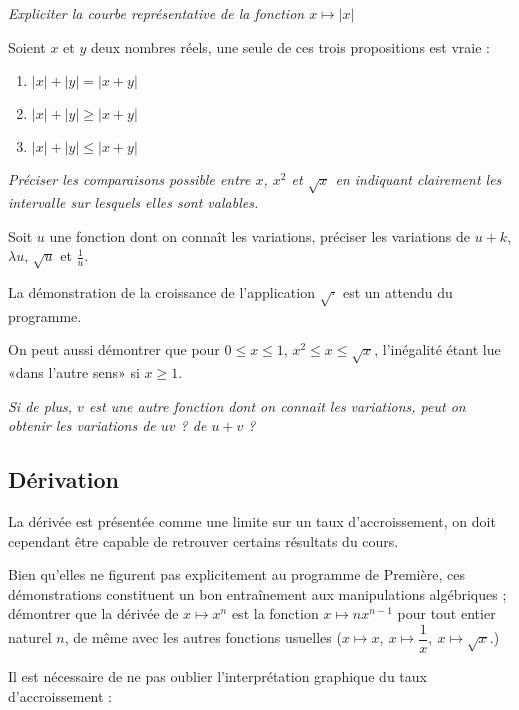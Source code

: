 \documentclass[a4paper,12pt,french]{article}
\newcommand{\abs}[1]{\left\lvert #1\right\rvert}
\begin{document}
    \emph{Expliciter la courbe représentative de la fonction $x\mapsto
    \abs{x}$}

Soient $x$ et $y$ deux nombres réels, une seule de ces trois
propositions est vraie :
\begin{multicols}{3}
  \begin{enumerate}
    \item $\abs{x} + \abs{y} = \abs{x+y}$
    \item $\abs{x} + \abs{y} \geqslant \abs{x+y}$
    \item $\abs{x} + \abs{y} \leqslant \abs{x+y}$
  \end{enumerate}
\end{multicols}

\emph{Préciser les comparaisons possible entre $x$, $x^2$ et $\sqrt{x}$
en indiquant clairement les intervalle sur lesquels elles sont
valables.}

Soit $u$ une fonction dont on connaît les variations, préciser les
variations de $u + k$, $\lambda u$, $\sqrt{u}$ et $\frac1u$.

La démonstration de la croissance de l'application $\sqrt{\cdot}$ est un
attendu du programme.

On peut aussi démontrer que pour $0\leqslant x \leqslant 1$, $x^2
\leqslant x \leqslant \sqrt{x}$, l'inégalité étant lue «dans l'autre
sens» si $x \geqslant 1$.

\emph{Si de plus, $v$ est une autre fonction dont on connait les variations,
peut on obtenir les variations de $uv$ ? de $u+v$ ?}

\subsection{Dérivation}

La dérivée est présentée comme une limite sur un taux d'accroissement,
on doit cependant être capable de retrouver certains résultats du cours.

Bien qu'elles ne figurent pas explicitement au programme de Première,
ces démonstrations constituent un bon entraînement aux manipulations
algébriques ; démontrer que la dérivée de $x\mapsto x^n$ est la
fonction $x\mapsto nx^{n-1}$ pour tout entier naturel $n$, de même avec
les autres fonctions usuelles ($x\mapsto x,\ x\mapsto \dfrac1x,\ x\mapsto
\sqrt{x}$.)

Il est nécessaire de ne pas oublier l'interprétation graphique du taux
d'accroissement :
\begin{center}
\end{center}
\end{document}
